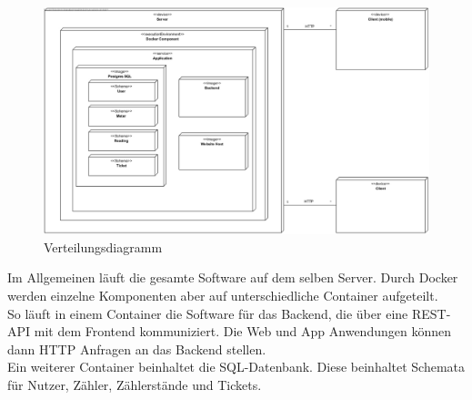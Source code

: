 \begin{figure}[H]
	\centering
	\caption{Verteilungsdiagramm}
	\includegraphics[width=16cm]{img/diagrams/DeploymentDiagram}
\end{figure}
Im Allgemeinen läuft die gesamte Software auf dem selben Server. Durch Docker werden einzelne Komponenten aber auf unterschiedliche Container aufgeteilt.\\
So läuft in einem Container die Software für das Backend, die über eine REST-API mit dem Frontend kommuniziert. Die Web und App Anwendungen können dann HTTP Anfragen an das Backend stellen.\\
Ein weiterer Container beinhaltet die SQL-Datenbank. Diese beinhaltet Schemata für Nutzer, Zähler, Zählerstände und Tickets.
